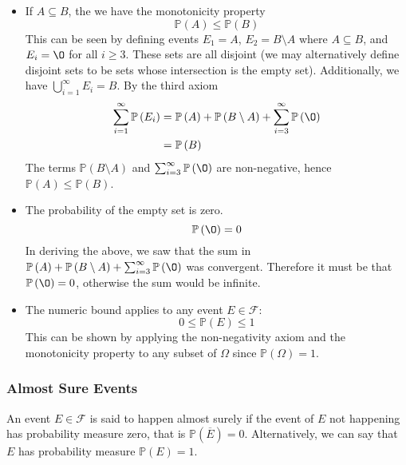 \documentclass[11pt]{report} %
\begin{document}
\begin{itemize}
\item If $A \subseteq B$, the we have the monotonicity property
\begin{equation}
\mathbb{P}\left(A\right) \leq \mathbb{P}\left(B\right)
\end{equation}
This can be seen by defining events $E_{1} = A$, $E_{2} = B\setminus A$ where $A\subseteq B$, and $E_{i} = \O$ for all $i\geq 3$. These sets are all disjoint (we may alternatively define disjoint sets to be sets whose intersection is the empty set). Additionally, we have $\bigcup_{i = 1}^{\infty}E_{i} = B$. By the third axiom
\begin{align}
\sum_{i = 1}^{\infty}\mathbb{P}\left(E_{i}\right) &= \mathbb{P}\left(A\right) + \mathbb{P}\left(B\setminus A\right) + \sum_{i = 3}^{\infty}\mathbb{P}\left(\O\right) \\
&= \mathbb{P}\left(B\right)
\end{align}
The terms $\mathbb{P}\left(B\setminus A\right)$ and $\sum_{i = 3}^{\infty}\mathbb{P}\left(\O\right)$ are non-negative, hence $\mathbb{P}\left(A\right) \leq \mathbb{P}\left(B\right)$.
\item The probability of the empty set is zero.
\begin{equation}
\mathbb{P}\left(\O\right) = 0
\end{equation}
In deriving the above, we saw that the sum in $\mathbb{P}\left(A\right) + \mathbb{P}\left(B\setminus A\right) + \sum_{i = 3}^{\infty}\mathbb{P}\left(\O\right)$ was convergent. Therefore it must be that $\mathbb{P}\left(\O\right) = 0$, otherwise the sum would be infinite.
\item The numeric bound applies to any event $E \in \mathcal{F}$:
\begin{equation}
0 \leq \mathbb{P}\left(E\right) \leq 1
\end{equation}
This can be shown by applying the non-negativity axiom and the monotonicity property to any subset of $\Omega$ since $\mathbb{P}\left(\Omega\right) = 1$.
\end{itemize}

\subsubsection{Almost Sure Events}

An event $E\in\mathcal{F}$ is said to happen almost surely if the event of $E$ not happening has probability measure zero, that is $\mathbb{P}\left(\overline{E}\right) = 0$. Alternatively, we can say that $E$ has probability measure $\mathbb{P}\left(E\right) = 1$.
\end{document}

